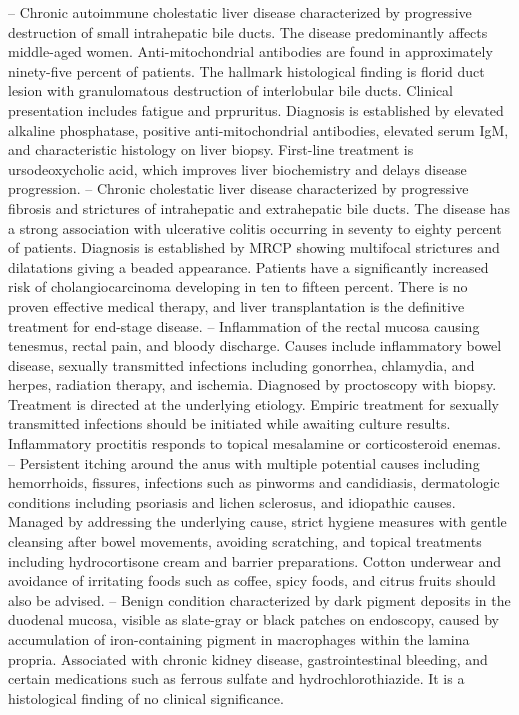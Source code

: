 -- Chronic autoimmune cholestatic liver disease characterized by progressive destruction of small intrahepatic bile ducts. The disease predominantly affects middle-aged women. Anti-mitochondrial antibodies are found in approximately ninety-five percent of patients. The hallmark histological finding is florid duct lesion with granulomatous destruction of interlobular bile ducts. Clinical presentation includes fatigue and prpruritus. Diagnosis is established by elevated alkaline phosphatase, positive anti-mitochondrial antibodies, elevated serum IgM, and characteristic histology on liver biopsy. First-line treatment is ursodeoxycholic acid, which improves liver biochemistry and delays disease progression.
-- Chronic cholestatic liver disease characterized by progressive fibrosis and strictures of intrahepatic and extrahepatic bile ducts. The disease has a strong association with ulcerative colitis occurring in seventy to eighty percent of patients. Diagnosis is established by MRCP showing multifocal strictures and dilatations giving a beaded appearance. Patients have a significantly increased risk of cholangiocarcinoma developing in ten to fifteen percent. There is no proven effective medical therapy, and liver transplantation is the definitive treatment for end-stage disease.
-- Inflammation of the rectal mucosa causing tenesmus, rectal pain, and bloody discharge. Causes include inflammatory bowel disease, sexually transmitted infections including gonorrhea, chlamydia, and herpes, radiation therapy, and ischemia. Diagnosed by proctoscopy with biopsy. Treatment is directed at the underlying etiology. Empiric treatment for sexually transmitted infections should be initiated while awaiting culture results. Inflammatory proctitis responds to topical mesalamine or corticosteroid enemas.
-- Persistent itching around the anus with multiple potential causes including hemorrhoids, fissures, infections such as pinworms and candidiasis, dermatologic conditions including psoriasis and lichen sclerosus, and idiopathic causes. Managed by addressing the underlying cause, strict hygiene measures with gentle cleansing after bowel movements, avoiding scratching, and topical treatments including hydrocortisone cream and barrier preparations. Cotton underwear and avoidance of irritating foods such as coffee, spicy foods, and citrus fruits should also be advised.
-- Benign condition characterized by dark pigment deposits in the duodenal mucosa, visible as slate-gray or black patches on endoscopy, caused by accumulation of iron-containing pigment in macrophages within the lamina propria. Associated with chronic kidney disease, gastrointestinal bleeding, and certain medications such as ferrous sulfate and hydrochlorothiazide. It is a histological finding of no clinical significance.
